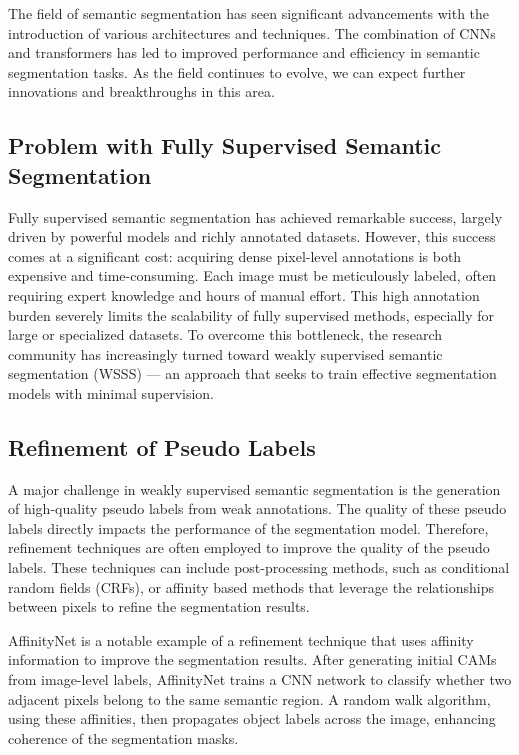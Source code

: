 The field of semantic segmentation has seen significant advancements with the introduction of various architectures and techniques. The combination of CNNs and transformers has led to improved performance and efficiency in semantic segmentation tasks. As the field continues to evolve, we can expect further innovations and breakthroughs in this area.

\subsection{Problem with Fully Supervised Semantic Segmentation}
\label{subsec:problem-with-fully-supervised}
Fully supervised semantic segmentation has achieved remarkable success, largely driven by powerful models and richly annotated datasets. However, this success comes at a significant cost: acquiring dense pixel-level annotations is both expensive and time-consuming. Each image must be meticulously labeled, often requiring expert knowledge and hours of manual effort. This high annotation burden severely limits the scalability of fully supervised methods, especially for large or specialized datasets. To overcome this bottleneck, the research community has increasingly turned toward weakly supervised semantic segmentation (WSSS) — an approach that seeks to train effective segmentation models with minimal supervision.






\subsection{Refinement of Pseudo Labels}
\label{subsec:refinement-of-pseudo-labels}
A major challenge in weakly supervised semantic segmentation is the generation of high-quality pseudo labels from weak annotations. The quality of these pseudo labels directly impacts the performance of the segmentation model. Therefore, refinement techniques are often employed to improve the quality of the pseudo labels. These techniques can include post-processing methods, such as conditional random fields (CRFs), or affinity based methods that leverage the relationships between pixels to refine the segmentation results.

AffinityNet \cite{wsss_affinitynet} is a notable example of a refinement technique that uses affinity information to improve the segmentation results. After generating initial CAMs from image-level labels, AffinityNet trains a CNN network to classify whether two adjacent pixels belong to the same semantic region. A random walk algorithm, using these affinities, then propagates object labels across the image, enhancing coherence of the segmentation masks.


